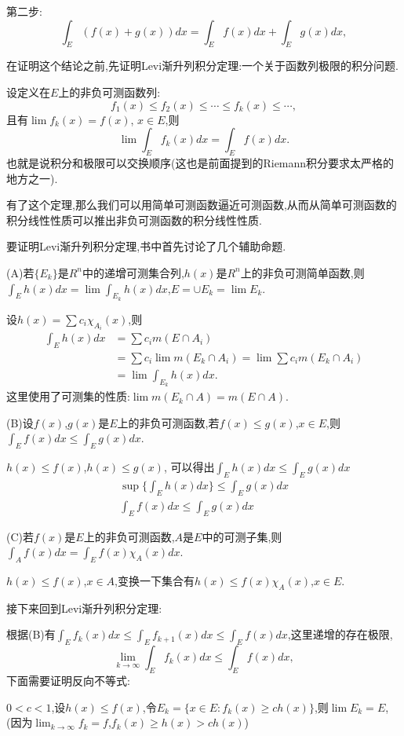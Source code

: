 \documentclass[12pt,a4paper,openany]{book}
\begin{document}
第二步:
\[
\int_{E}{(f(x)+g(x))dx} = \int_{E}{f(x)dx} + \int_{E}{g(x)dx},
\]

在证明这个结论之前,先证明Levi渐升列积分定理:一个关于函数列极限的积分问题.

设定义在$E$上的非负可测函数列:
\[
f_1(x) \le f_2(x) \le \cdots \le f_k(x) \le \cdots,
\]
且有$\lim{f_k(x)} = f(x)$, $x \in E$,则
\[
\lim{\int_{E}{f_k(x)dx}} = \int_{E}{f(x)dx}.
\]
也就是说积分和极限可以交换顺序(这也是前面提到的Riemann积分要求太严格的地方之一).

有了这个定理,那么我们可以用简单可测函数逼近可测函数,从而从简单可测函数的积分线性性质可以推出非负可测函数的积分线性性质.

要证明Levi渐升列积分定理,书中首先讨论了几个辅助命题.

(A)若$\{E_k\}$是$R^n$中的递增可测集合列,$h(x)$是$R^n$上的非负可测简单函数,则$\int_{E}{h(x)dx} = \lim{\int_{E_k}{h(x)dx}}$,$E=\cup{E_k}=\lim{E_k}$.

设$h(x)=\sum{c_i\chi_{A_i}{(x)}}$,则
\[
\begin{aligned}
\int_{E}{h(x)dx} &= \sum{c_im(E \cap A_i)} \\
&=\sum{c_i\lim{m(E_k \cap A_i)}} = \lim{\sum{c_im(E_k \cap A_i)}} \\
&=\lim{\int_{E_k}{h(x)dx}}.
\end{aligned}
\]
这里使用了可测集的性质:$\lim{m(E_k \cap A)} = m(E \cap A)$.

(B)设$f(x)$,$g(x)$是$E$上的非负可测函数,若$f(x) \le g(x)$,$x\in E$,则$\int_{E}{f(x)dx} \le \int_{E}{g(x)dx}$.

$h(x) \le f(x)$,$h(x) \le g(x)$, 可以得出$\int_{E}{h(x)dx} \le \int_{E}{g(x)dx}$
\begin{gather*}
\sup\{\int_{E}{h(x)dx}\} \le \int_{E}{g(x)dx} \\
\int_{E}{f(x)dx} \le \int_{E}{g(x)dx}
\end{gather*}

(C)若$f(x)$是$E$上的非负可测函数,$A$是$E$中的可测子集,则$\int_{A}{f(x)dx} = \int_{E}{f(x)\chi_{A}{(x)}dx}$.

$h(x) \le f(x)$,$x \in A$,变换一下集合有$h(x)\le f(x)\chi_{A}(x)$,$x\in E$.

接下来回到Levi渐升列积分定理:

根据(B)有$\int_{E}{f_k(x)dx} \le \int_{E}{f_{k+1}(x)dx} \le \int_{E}{f(x)dx}$,这里递增的存在极限,
\[
\lim_{k \rightarrow \infty}{\int_{E}{f_k(x)dx}} \le \int_{E}{f(x)dx},
\]
下面需要证明反向不等式:

$0 < c < 1$,设$h(x) \le f(x)$,令$E_k=\{x \in E:f_k(x) \ge ch(x)\}$,则$\lim{E_k} = E$,(因为$\lim_{k \rightarrow \infty}{f_k} = f$,$f_k(x) \ge h(x)>ch(x)$)
\end{document}
